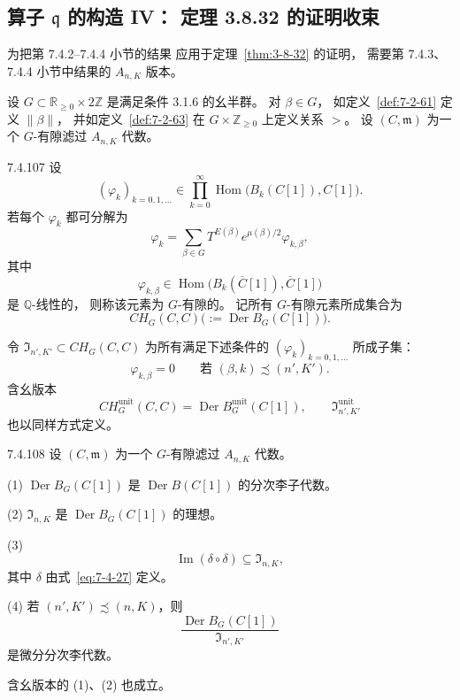 
\subsection{算子 $\mathfrak q$ 的构造 IV：
定理 3.8.32 的证明收束}
\label{subsec:7-4-5}

为把第 7.4.2--7.4.4 小节的结果
应用于定理~\ref{thm:3-8-32} 的证明，
需要第 7.4.3、7.4.4 小节中结果的
$A_{n,K}$ 版本。

设
$G\subset\mathbb R_{\ge0}\times2\mathbb Z$
是满足条件 3.1.6 的幺半群。
对 $\beta\in G$，
如定义~\ref{def:7-2-61} 定义
$\|\beta\|$，
并如定义~\ref{def:7-2-63}
在 $G\times\mathbb Z_{\ge0}$ 上定义关系 $>$。
设 $(C,\mathfrak m)$
为一个 $G$-有隙滤过 $A_{n,K}$ 代数。

\begin{definition}{7.4.107}\label{def:7-4-107}
设
\[
(\varphi_k)_{k=0,1,\ldots}
\in
\prod_{k=0}^{\infty}
\operatorname{Hom}\bigl(B_k(C[1]),C[1]\bigr).
\]
若每个 $\varphi_k$ 都可分解为
\[
\varphi_k
=\sum_{\beta\in G}
T^{E(\beta)}e^{\mu(\beta)/2}\varphi_{k,\beta},
\]
其中
\[
\varphi_{k,\beta}\in
\operatorname{Hom}\bigl(
B_k(\overline C[1]),
\overline C[1]
\bigr)
\]
是 $\mathbb Q$-线性的，
则称该元素为 $G$-有隙的。
记所有 $G$-有隙元素所成集合为
\[
CH_G(C,C)
\bigl(:=\operatorname{Der}B_G(C[1])\bigr).
\]

令
$\mathfrak I_{n',K'}\subset CH_G(C,C)$
为所有满足下述条件的
$(\varphi_k)_{k=0,1,\ldots}$ 所成子集：
\[
\varphi_{k,\beta}=0
\qquad
\text{若 }(\beta,k)\precsim(n',K').
\]
含幺版本
\[
CH_G^{\mathrm{unit}}(C,C)
=\operatorname{Der}B_G^{\mathrm{unit}}(C[1]),
\qquad
\mathfrak I_{n',K'}^{\mathrm{unit}}
\]
也以同样方式定义。
\end{definition}

\begin{lemma}{7.4.108}\label{lem:7-4-108}
设 $(C,\mathfrak m)$
为一个 $G$-有隙滤过 $A_{n,K}$ 代数。

\par\noindent\textup{(1)}
$\operatorname{Der}B_G(C[1])$
是 $\operatorname{Der}B(C[1])$
的分次李子代数。

\par\noindent\textup{(2)}
$\mathfrak I_{n,K}$
是 $\operatorname{Der}B_G(C[1])$ 的理想。

\par\noindent\textup{(3)}
\[
\operatorname{Im}(\delta\circ\delta)
\subseteq\mathfrak I_{n,K},
\]
其中 $\delta$ 由式~\eqref{eq:7-4-27} 定义。

\par\noindent\textup{(4)}
若 $(n',K')\precsim(n,K)$，则
\[
\frac{\operatorname{Der}B_G(C[1])}
{\mathfrak I_{n',K'}}
\]
是微分分次李代数。

含幺版本的 (1)、(2) 也成立。
\end{lemma}

